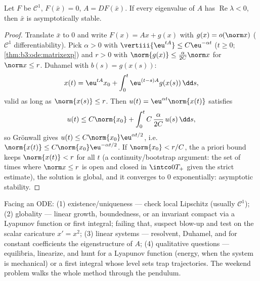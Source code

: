 \begin{theorem}
\label{thm:b3:ode:linearization}
Let $F$ be $\mathcal C^1$, $F(\bar x) = 0$, $A = DF(\bar x)$.
If every eigenvalue of $A$ has $\operatorname{Re}\lambda <
0$, then $\bar x$ is asymptotically stable.
\end{theorem}

\begin{proof}
Translate $\bar x$ to $0$ and write $F(x) = Ax + g(x)$ with
$g(x) = o(\norm x)$ ($\mathcal C^1$ differentiability). Pick
$\alpha > 0$ with $\vertiii{\eu^{tA}} \leq C\eu^{-\alpha t}$
($t \geq 0$; \cref{thm:b3:ode:matrixexp}) and $r > 0$ with
$\norm{g(x)} \leq \frac{\alpha}{2C}\norm x$ for $\norm x \leq
r$. Duhamel with $b(s) = g(x(s))$:
\[
x(t) = \eu^{tA}x_0 + \int_0^t\eu^{(t-s)A}g(x(s))\,\dd s,
\]
valid as long as $\norm{x(s)} \leq r$. Then $u(t) =
\eu^{\alpha t}\norm{x(t)}$ satisfies
\[
u(t) \leq C\norm{x_0} +
\int_0^{t}C\,\frac{\alpha}{2C}\,u(s)\,\dd s ,
\]
so Gr\"onwall gives $u(t) \leq C\norm{x_0}\eu^{\alpha t/2}$,
i.e.\ $\norm{x(t)} \leq C\norm{x_0}\eu^{-\alpha t/2}$. If
$\norm{x_0} < r/C$, the a priori bound keeps $\norm{x(t)} <
r$ for all $t$ (a continuity/bootstrap argument: the set of
times where $\norm x \leq r$ is open and closed in
$\intco0{T_+}$ given the strict estimate), the solution is
global, and it converges to $0$ exponentially: asymptotic
stability.
\end{proof}

\begin{method}\label{met:b3:ode:strategy}
Facing an ODE: (1) existence/uniqueness --- check local
Lipschitz (usually $\mathcal C^1$); (2) globality --- linear
growth, boundedness, or an invariant compact via a Lyapunov
function or first integral; failing that, suspect blow-up
and test on the scalar caricature $x' = x^2$; (3) linear
systems --- resolvent, Duhamel, and for constant
coefficients the eigenstructure of $A$; (4) qualitative
questions --- equilibria, linearize, and hunt for a Lyapunov
function (energy, when the system is mechanical) or a first
integral whose level sets trap trajectories. The weekend
problem walks the whole method through the pendulum.
\end{method}

